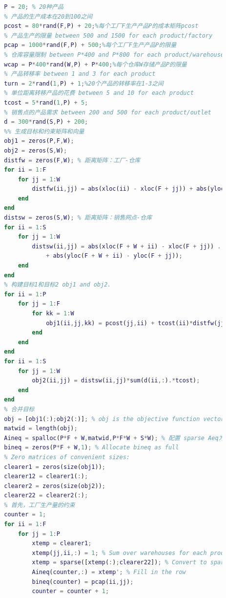 \begin{lstlisting}[language = Matlab]
        %% 生成随机容量,成本,和需求
        P = 20; % 20种产品
        % 产品的生产成本在20到100之间
        pcost = 80*rand(F,P) + 20;%每个工厂F生产产品P的成本矩阵pcost
        % 产品生产的限量 between 500 and 1500 for each product/factory
        pcap = 1000*rand(F,P) + 500;%每个工厂F生产产品P的限量
        % 仓库容量限制 between P*400 and P*800 for each product/warehouse
        wcap = P*400*rand(W,P) + P*400;%每个仓库W存储产品P的限量
        % 产品转移率 between 1 and 3 for each product
        turn = 2*rand(1,P) + 1;%20个产品的转移率在1-3之间
        % 单位距离转移产品的花费 between 5 and 10 for each product
        tcost = 5*rand(1,P) + 5;
        % 销售点的产品需求 between 200 and 500 for each product/outlet
        d = 300*rand(S,P) + 200;
        %% 生成目标和约束矩阵和向量
        obj1 = zeros(P,F,W);
        obj2 = zeros(S,W);
        distfw = zeros(F,W); % 距离矩阵：工厂-仓库
        for ii = 1:F
            for jj = 1:W
                distfw(ii,jj) = abs(xloc(ii) - xloc(F + jj)) + abs(yloc(ii) - yloc(F + jj));
            end
        end
        distsw = zeros(S,W); % 距离矩阵：销售网点-仓库
        for ii = 1:S
            for jj = 1:W
                distsw(ii,jj) = abs(xloc(F + W + ii) - xloc(F + jj)) ...
                    + abs(yloc(F + W + ii) - yloc(F + jj));
            end
        end
        % 构建目标1和目标2 obj1 and obj2.
        for ii = 1:P
            for jj = 1:F
                for kk = 1:W
                    obj1(ii,jj,kk) = pcost(jj,ii) + tcost(ii)*distfw(jj,kk);
                end
            end
        end
        for ii = 1:S
            for jj = 1:W
                obj2(ii,jj) = distsw(ii,jj)*sum(d(ii,:).*tcost);
            end
        end
        % 合并目标
        obj = [obj1(:);obj2(:)]; % obj is the objective function vector
        matwid = length(obj);
        Aineq = spalloc(P*F + W,matwid,P*F*W + S*W); % 配置 sparse Aeq为非零元素配置内存
        bineq = zeros(P*F + W,1); % Allocate bineq as full
        % Zero matrices of convenient sizes:
        clearer1 = zeros(size(obj1));
        clearer12 = clearer1(:);
        clearer2 = zeros(size(obj2));
        clearer22 = clearer2(:);
        % 首先，工厂生产量的约束
        counter = 1;
        for ii = 1:F
            for jj = 1:P
                xtemp = clearer1;
                xtemp(jj,ii,:) = 1; % Sum over warehouses for each product and factory为每个产品和工厂仓库求和
                xtemp = sparse([xtemp(:);clearer22]); % Convert to sparse
                Aineq(counter,:) = xtemp'; % Fill in the row
                bineq(counter) = pcap(ii,jj);
                counter = counter + 1;

\end{lstlisting}
